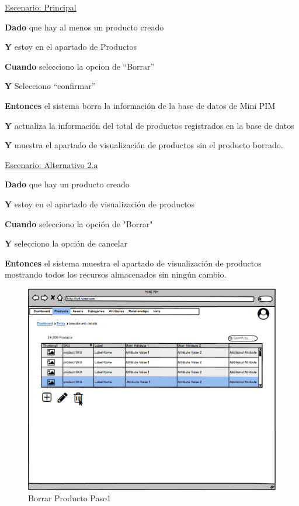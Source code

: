 \underline{Escenario: Principal}\par
\vspace{0.15cm}
\textbf{Dado} que hay al menos un producto creado\par
\textbf{Y} estoy en el apartado de Productos\par
\textbf{Cuando} selecciono la opcion de “Borrar”\par
\textbf{Y} Selecciono “confirmar”\par
\textbf{Entonces} el sistema borra la información de la base de datos de Mini PIM\par
\textbf{Y} actualiza la información del total de productos registrados en la base de datos\par
\textbf{Y} muestra el apartado de visualización de productos sin el producto borrado.\par
\vspace{0.20cm}

\underline{Escenario: Alternativo 2.a}\par
\vspace{0.15cm}
\textbf{Dado} que hay un producto creado\par
\textbf{Y} estoy en el apartado de visualización de productos\par
\textbf{Cuando} selecciono la opción de "Borrar"\par
\textbf{Y} selecciono la opción de cancelar\par
\textbf{Entonces} el sistema muestra el apartado de visualización de productos mostrando todos los recursos almacenados sin ningún cambio.\par
\vspace{0.20cm}

\begin{figure}[H]
    \includegraphics[width=1\linewidth]{mockups/RF2-X Borrar Producto (Borrar Producto desde listado).png}
    \caption{Borrar Producto Paso1}
   \end{figure}
\vspace{1.0cm}

